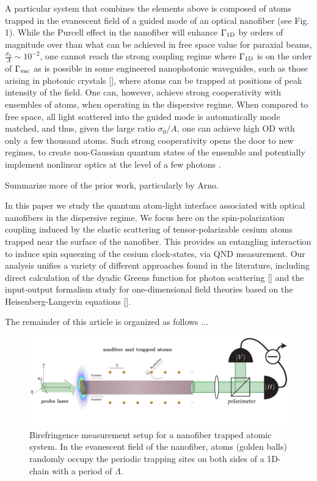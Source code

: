 \documentclass[preprint,aps,pra,onecolumn]{revtex4-1} %
\newcommand{\oneD}{{\rm 1D}}
\newcommand{\vac}{{\rm vac}}
\newcommand{\change}[1]{{\color{RoyalBlue} #1}}
\begin{document}
A particular system that combines the elements above is composed of atoms trapped in the evanescent field of a guided mode of an optical nanofiber \cite{vetsch_nanofiber-based_2012, lacroute_state-insensitive_2012} (see Fig. 1).  While the Purcell effect in the nanofiber will enhance  $\Gamma_{\oneD}$ by orders of magnitude over than what can be achieved in free space value for paraxial beams,  $\frac{\sigma_0}{A} \sim  10^{-2}$, one cannot reach the strong coupling regime where $\Gamma_{\oneD}$ is on the order of $\Gamma_{\vac}$ as is possible in some engineered nanophotonic waveguides, such as those arising in photonic crystals [], where atoms can be trapped at positions of peak intensity of the field.  One can, however, achieve strong cooperativity with ensembles of atoms, when operating in the dispersive regime.  When compared to free space, all light scattered into the guided mode is automatically mode matched, and thus, given the large ratio $\sigma_0/A$, one can achieve high OD with only a few thousand atoms.  Such strong cooperativity opens the door to new regimes, to create non-Gaussian quantum states of the ensemble \cite{} and potentially implement nonlinear optics at the level of a few photons \cite{}.


 {\color{red}  Summarize more of the prior work, particularly by Arno}.  

In this paper we study the quantum atom-light interface associated with optical nanofibers in the 
dispersive regime.  We focus here on the spin-polarization coupling induced by the elastic scattering of 
tensor-polarizable cesium atoms trapped near the surface of the nanofiber.  This provides an entangling 
interaction to induce spin squeezing of the cesium clock-states, via QND measurement.  Our analysis unifies a variety of different approaches found in the literature, including direct calculation of the dyadic Greens function for photon scattering [] and the  input-output formalism study for one-dimensional field theories based on the Heisenberg-Langevin  equations [].

\change{The remainder of this article is organized as follows ...}

\begin{figure}
\centering
\includegraphics[scale=0.35]{./Figs/BirefringenceMeasurement_randomAtoms}
\caption{Birefringence measurement setup for a nanofiber trapped atomic system. In the evanescent 
field of the nanofiber, atoms (golden balls) randomly  occupy the periodic trapping sites on both sides of 
a 1D-chain with a period of $\Lambda$.}
\label{fig:BirefringenceMeasurement}
\end{figure}
\end{document}
